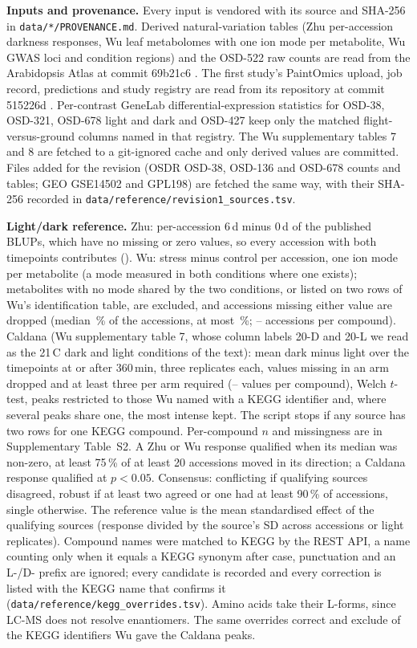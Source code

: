 \documentclass{npjlayout}
\begin{document}
\textbf{Inputs and provenance.} Every input is vendored with its source and SHA-256 in
\texttt{data/*/PROVENANCE.md}. Derived natural-variation tables (Zhu per-accession darkness
responses, Wu leaf metabolomes with one ion mode per metabolite, Wu GWAS loci and condition
regions) and the OSD-522 raw counts are read from the Arabidopsis Atlas at commit 69b21c6
\citep{atlas}. The first study's PaintOmics upload, job record, predictions and study registry are
read from its repository at commit 515226d \citep{firststudy}. Per-contrast GeneLab
differential-expression statistics for OSD-38, OSD-321, OSD-678 light and dark and OSD-427
\citep{osd38,osd321,osd678,osd427} keep only the matched flight-versus-ground columns named in that
registry. The Wu supplementary tables 7 and 8 are fetched to a git-ignored cache and only derived
values are committed. Files added for the revision (OSDR OSD-38, OSD-136 and OSD-678 counts and
tables; GEO GSE14502 and GPL198) are fetched the same way, with their SHA-256 recorded in
\texttt{data/reference/revision1\_sources.tsv}.

\textbf{Light/dark reference.} Zhu: per-accession 6\,d minus 0\,d of the published BLUPs, which
have no missing or zero values, so every accession with both timepoints contributes (\nZhuAcc).
Wu: stress minus control per accession, one ion mode per metabolite (a mode measured in both
conditions where one exists); metabolites with no mode shared by the two conditions, or listed on
two rows of Wu's identification table, are excluded, and accessions missing either value are
dropped (median \wuMissMedian\,\% of the \nWuPossible{} accessions, at most \wuMissMax\,\%;
\wuNMin--\nWuAcc{} accessions per compound). Caldana (Wu supplementary table 7, whose column labels
20-D and 20-L we read as the 21\,\textdegree C dark and light conditions of the text): mean dark
minus light over the timepoints at or after 360\,min, three replicates each, values missing in an
arm dropped and at least three per arm required (\nCaldanaMin--\nCaldanaMax{} values per compound),
Welch $t$-test, peaks restricted to those Wu named with a KEGG identifier and, where several peaks
share one, the most intense kept. The script stops if any source has two rows for one KEGG compound.
Per-compound $n$ and missingness are in Supplementary Table~S2. A Zhu or Wu
response qualified when its median was non-zero, at least 75\,\% of at least 20 accessions moved in
its direction; a Caldana response qualified at $p<0.05$. Consensus: conflicting if qualifying
sources disagreed, robust if at least two agreed or one had at least 90\,\% of accessions, single
otherwise. The reference value is the mean standardised effect of the qualifying sources (response
divided by the source's SD across accessions or light replicates). Compound names were matched to
KEGG by the REST API, a name counting only when it equals a KEGG synonym after case, punctuation
and an L-/D- prefix are ignored; every candidate is recorded and every correction is listed with
the KEGG name that confirms it (\texttt{data/reference/kegg\_overrides.tsv}). Amino acids take
their L-forms, since LC-MS does not resolve enantiomers. The same overrides correct
\nOverCaldanaFix{} and exclude \nOverCaldanaExcl{} of the KEGG identifiers Wu gave the Caldana peaks.
\end{document}
